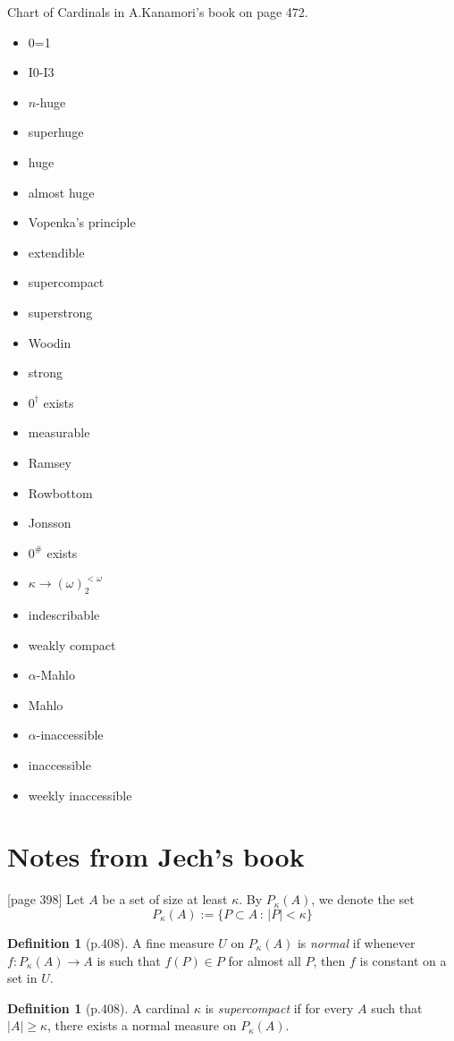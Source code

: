 \documentclass[bibother]{asl}
\theoremstyle{definition}
\newtheorem{defn}[thm]{Definition}
\theoremstyle{remark}
\begin{document}
\newpage
Chart of Cardinals in A.Kanamori's book on page 472.
\begin{itemize}
\item 0=1
\item I0-I3
\item $n$-huge
\item superhuge
\item huge
\item almost huge
\item Vopenka's principle
\item extendible
\item supercompact
\item superstrong
\item Woodin
\item strong
\item $0^\dagger$ exists
\item measurable
\item Ramsey
\item Rowbottom
\item Jonsson
\item $0^{\textrm{\#}}$ exists
\item $\kappa\longrightarrow (\omega)^{<\omega}_2$ 
\item indescribable
\item weakly compact
\item $\alpha$-Mahlo
\item Mahlo
\item $\alpha$-inaccessible
\item inaccessible
\item weekly inaccessible

\end{itemize}

\section{Notes from Jech's book}
[page 398]
Let $A$ be a set of size at least $\kappa$. By $P_\kappa(A)$, we denote the set 
$$ P_\kappa(A):=\{P\subset A \, :\, |P|<\kappa     \}
$$ 

\begin{defn}[p.408]
A fine measure $U$ on $P_\kappa(A)$ is {\em normal} if whenever $f:P_\kappa(A)\to A$
is such that $f(P)\in P$ for almost all $P$, then $f$ is constant on a set in $U$.
\end{defn}

\begin{defn}[p.408]
A cardinal $\kappa$ is {\em supercompact} if for every $A$ such that $|A|\ge\kappa$, there exists
a normal measure on $P_\kappa(A)$.
\end{defn}
\end{document}

